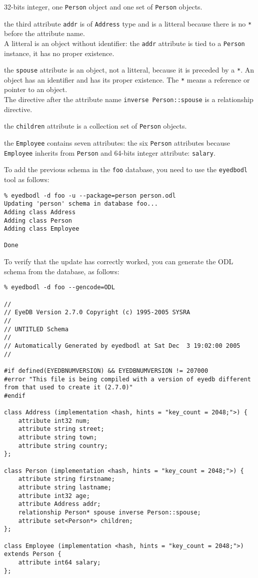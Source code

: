 32-bits integer, one \texttt{Person} object and one set of \texttt{Person}
objects.
\bi
\item the third attribute \texttt{addr} is of \texttt{Address} type and is
a litteral because there is no \texttt{*} before the attribute name.\\
A litteral is an object without identifier: the \texttt{addr} attribute
is tied to a \texttt{Person} instance, it has no proper existence.
\item the \texttt{spouse} attribute is an object, not a litteral, because
it is preceded by a \texttt{*}. An object has an identifier and has its
proper existence. The \texttt{*} means a reference or pointer to an
object.\\
The directive after the attribute name \texttt{inverse Person::spouse}
is a relationship directive.
\item the \texttt{children} attribute is a collection set of
\texttt{Person} objects.
\ei
\item the \texttt{Employee} contains seven attributes: the six \texttt{Person}
attributes because \texttt{Employee} inherits from \texttt{Person} and 
64-bits integer attribute: \texttt{salary}.
\ei

To add the previous schema in the \texttt{foo} database, you need to
use the \texttt{eyedbodl} tool as follows:
\verbsize \begin{verbatim}
% eyedbodl -d foo -u --package=person person.odl
Updating 'person' schema in database foo...
Adding class Address
Adding class Person
Adding class Employee

Done
\end{verbatim}
\normalsize
To verify that the update has correctly worked, you can generate
the ODL schema from the database, as follows:
\verbsize \begin{verbatim}
% eyedbodl -d foo --gencode=ODL

//
// EyeDB Version 2.7.0 Copyright (c) 1995-2005 SYSRA
//
// UNTITLED Schema
//
// Automatically Generated by eyedbodl at Sat Dec  3 19:02:00 2005
//

#if defined(EYEDBNUMVERSION) && EYEDBNUMVERSION != 207000
#error "This file is being compiled with a version of eyedb different from that used to create it (2.7.0)"
#endif

class Address (implementation <hash, hints = "key_count = 2048;">) {
	attribute int32 num;
	attribute string street;
	attribute string town;
	attribute string country;
};

class Person (implementation <hash, hints = "key_count = 2048;">) {
	attribute string firstname;
	attribute string lastname;
	attribute int32 age;
	attribute Address addr;
	relationship Person* spouse inverse Person::spouse;
	attribute set<Person*> children;
};

class Employee (implementation <hash, hints = "key_count = 2048;">) extends Person {
	attribute int64 salary;
};
\end{verbatim}
\normalsize

